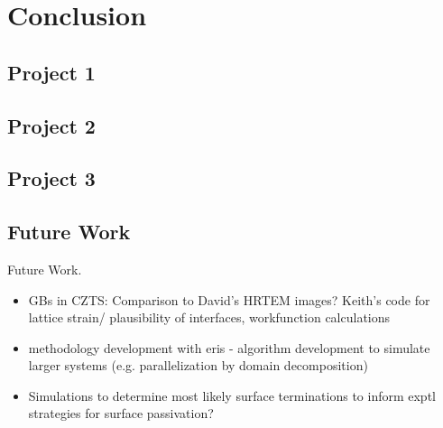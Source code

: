 
\chapter{Conclusion}

\label{ch:conclusions}

\section{Project 1}

\section{Project 2}

\section{Project 3}

\section{Future Work}

Future Work.
\begin{itemize}
\item GBs in CZTS: Comparison to David's HRTEM images? Keith's code for lattice strain/ plausibility of interfaces, workfunction calculations
\item methodology development with eris - algorithm development to simulate larger systems (e.g. parallelization by domain decomposition)
\item Simulations to determine most likely surface terminations to inform exptl strategies for surface passivation?
\end{itemize}

 